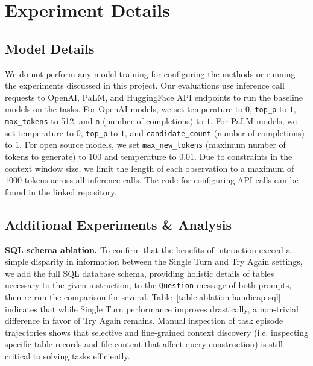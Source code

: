 \section{Experiment Details}
\label{appx:experiments}

\subsection{Model Details}
\label{appx:experiments:details}

We do not perform any model training for configuring the methods or running the experiments discussed in this project. Our evaluations use inference call requests to OpenAI, PaLM, and HuggingFace API endpoints to run the baseline models on the \benchmark{} tasks. For OpenAI models, we set temperature to $0$, \texttt{top\_p} to $1$, \texttt{max\_tokens} to 512, and \texttt{n} (number of completions) to $1$. For PaLM models, we set temperature to $0$, \texttt{top\_p} to $1$, and \texttt{candidate\_count} (number of completions) to $1$. For open source models, we set \texttt{max\_new\_tokens} (maximum number of tokens to generate) to $100$ and temperature to $0.01$. Due to constraints in the context window size, we limit the length of each observation to a maximum of $1000$ tokens across all inference calls. The code for configuring API calls can be found in the linked repository.

\subsection{Additional Experiments \& Analysis}
\label{appx:experiments:additional_expr}


% 

\textbf{SQL schema ablation.} To confirm that the benefits of interaction exceed a simple disparity in information between the Single Turn and Try Again settings, we add the full SQL database schema, providing holistic details of tables necessary to the given instruction, to the \texttt{Question} message of both prompts, then re-run the comparison for several. Table~\ref{table:ablation-handicap-sql} indicates that while Single Turn performance improves drastically, a non-trivial difference in favor of Try Again remains. Manual inspection of task episode trajectories shows that selective and fine-grained context discovery (i.e. inspecting specific table records and file content that affect query construction) is still critical to solving tasks efficiently.

